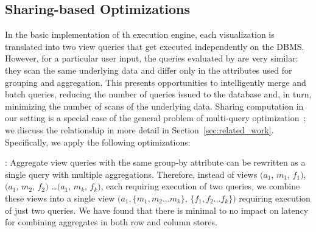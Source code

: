 
\subsection{Sharing-based Optimizations}
\label{sec:sharing_opt}


In the basic implementation of th execution engine, each visualization is translated into two view
queries that get executed independently on the DBMS.
However, for a particular user input, the queries evaluated by \SeeDB
are very similar: they scan the same underlying data and differ only in the 
attributes used for grouping and aggregation.
This presents opportunities to intelligently merge and batch queries, reducing 
the number of queries issued to the database and, in turn, minimizing the number 
of scans of the underlying data.
Sharing computation in our setting is a special case of the general problem
of multi-query optimization~\cite{DBLP:journals/tods/Sellis88}; we discuss the 
relationship in more detail in Section~\ref{sec:related_work}.
Specifically, we apply the following optimizations:

: Aggregate view queries 
with the same group-by attribute can be 
rewritten as a single query with multiple aggregations. 
Therefore, instead of views $(a_1$, $m_1$, $f_1)$, $(a_1$, $m_2$, $f_2)$ 
\ldots $(a_1$, $m_k$, $f_k)$, each requiring execution of two queries, we combine 
these views into a single view $(a_1, \{m_1, m_2\ldots m_k\}$, $\{f_1, f_2\ldots f_k\})$ 
requiring execution of just two queries.
We have found that there is minimal to no impact on latency 
for combining aggregates in both row and column stores. 

